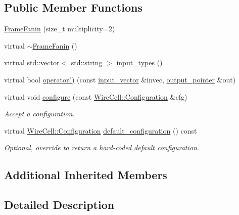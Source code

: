 \subsection*{Public Member Functions}
\begin{DoxyCompactItemize}
\item 
\hyperlink{class_wire_cell_1_1_gen_1_1_frame_fanin_a224d6a8e76a0951fced187486841adb1}{Frame\+Fanin} (size\+\_\+t multiplicity=2)
\item 
virtual \hyperlink{class_wire_cell_1_1_gen_1_1_frame_fanin_a5d487e41ab2ab08e39844c16a478501b}{$\sim$\+Frame\+Fanin} ()
\item 
virtual std\+::vector$<$ std\+::string $>$ \hyperlink{class_wire_cell_1_1_gen_1_1_frame_fanin_aeba173a6fd84de2b655fe56fd41d8c05}{input\+\_\+types} ()
\item 
virtual bool \hyperlink{class_wire_cell_1_1_gen_1_1_frame_fanin_a07a4dc2a3d5126a5540613534c73b914}{operator()} (const \hyperlink{class_wire_cell_1_1_i_fanin_node_aec26233b8b7756c5a42280a5db47ffda}{input\+\_\+vector} \&invec, \hyperlink{class_wire_cell_1_1_i_fanin_node_a748d9cd1916dda1cb12c3376b229f906}{output\+\_\+pointer} \&out)
\item 
virtual void \hyperlink{class_wire_cell_1_1_gen_1_1_frame_fanin_a076a618ff0e4bc05aa8a499542aee934}{configure} (const \hyperlink{namespace_wire_cell_a9f705541fc1d46c608b3d32c182333ee}{Wire\+Cell\+::\+Configuration} \&cfg)
\begin{DoxyCompactList}\small\item\em Accept a configuration. \end{DoxyCompactList}\item 
virtual \hyperlink{namespace_wire_cell_a9f705541fc1d46c608b3d32c182333ee}{Wire\+Cell\+::\+Configuration} \hyperlink{class_wire_cell_1_1_gen_1_1_frame_fanin_af2d38dac772719f126da9892a68818b2}{default\+\_\+configuration} () const
\begin{DoxyCompactList}\small\item\em Optional, override to return a hard-\/coded default configuration. \end{DoxyCompactList}\end{DoxyCompactItemize}
\subsection*{Additional Inherited Members}


\subsection{Detailed Description}


